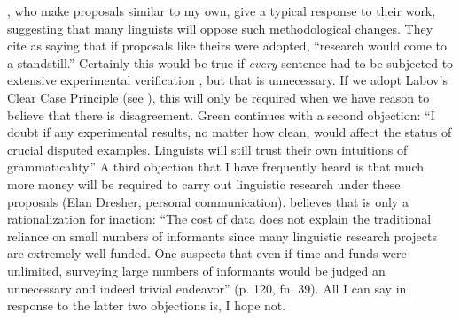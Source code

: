  \citet{CardenEtAl1981}, who make proposals similar to my own, give a typical response to their work, suggesting that many linguists will oppose such methodological changes. They cite \citet{Green1978} as saying that if proposals like theirs were adopted, ``research would come to a standstill.'' Certainly this would be true if \textit{every} sentence had to be subjected to extensive experimental verification \citep{Labov1975}, but that is unnecessary. If we adopt Labov's Clear Case Principle (see ), this will only be required when we have reason to believe that there is disagreement. Green continues with a second objection: ``I doubt if any experimental results, no matter how clean, would affect the status of crucial disputed examples. Linguists will still trust their own intuitions of grammaticality.'' A third objection that I have frequently heard is that much more money will be required to carry out linguistic research under these proposals (Elan Dresher, personal communication). \citet{Ringen1979} believes that is only a rationalization for inaction: ``The cost of data does not explain the traditional reliance on small numbers of informants since many linguistic research projects are extremely well-funded. One suspects that even if time and funds were unlimited, surveying large numbers of informants would be judged an unnecessary and indeed trivial endeavor'' (p. 120, fn. 39). All I can say in response to the latter two objections is, I hope not.


